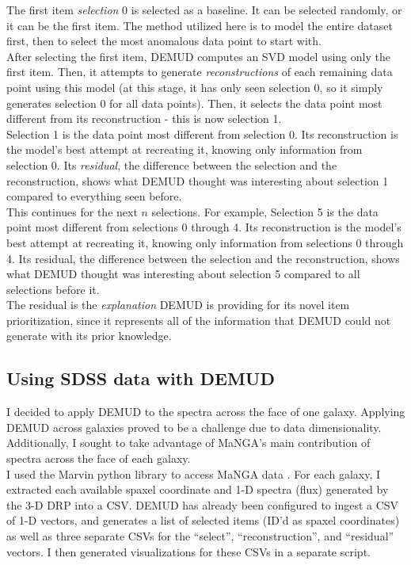 \documentclass[10pt, letterpaper, notitlepage]{article}
\begin{document}
The first item \textit{selection} 0 is selected as a baseline. It can be selected randomly, or it can be the
first item. The method utilized here is to model the entire
dataset first, then to select the most anomalous data point to start with.\\

After selecting the first item, DEMUD computes an SVD model using only the first item. Then, it attempts
to generate \textit{reconstructions} of each remaining data point using this model (at this stage, it has only
seen selection 0, so it simply generates selection 0 for all data points). Then, it selects the data point
most different from its reconstruction - this is now selection 1.\\

Selection 1 is the data point most different from selection 0. Its reconstruction is the model's best
attempt at recreating it, knowing only information from selection 0. Its \textit{residual}, the difference
between the selection and the reconstruction, shows what DEMUD thought was interesting about selection 1 compared
to everything seen before.\\

This continues for the next $n$ selections. For example, Selection 5 is the data point most different from
selections 0 through 4. Its reconstruction is the model's best attempt at recreating it, knowing only
information from selections 0 through 4. Its residual, the difference between the selection and the reconstruction,
shows what DEMUD thought was interesting about selection 5 compared to all selections before it.\\

The residual is the \textit{explanation} DEMUD is providing for its novel item prioritization, since it
represents all of the information that DEMUD could not generate with its prior knowledge.

\subsection{Using SDSS data with DEMUD}

I decided to apply DEMUD to the spectra across the face of one galaxy. Applying DEMUD across galaxies proved
to be a challenge due to data dimensionality. Additionally, I sought to take advantage of MaNGA's main
contribution of spectra across the face of each galaxy.\\

I used the Marvin python library to access MaNGA data \citep{2018arXiv181203833C}. For each galaxy,
I extracted each available spaxel coordinate and 1-D spectra (flux) generated by the 3-D DRP into a CSV.
DEMUD has already been configured to ingest a CSV of 1-D vectors, and generates a list of selected items
(ID'd as spaxel coordinates) as well as three separate CSVs for the ``select'', ``reconstruction'', and ``residual''
vectors. I then generated visualizations for these CSVs in a separate script.\\
\end{document}
